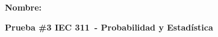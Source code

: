\documentclass[a4paper,addpoints,answers,11pt]{exam}
\newcommand{\course}{IEC 311}
\newcommand{\coursename}{Probabilidad y Estadística}
\begin{document}
\begin{flushleft}
\textbf{Nombre:}\ \hrulefill
\end{flushleft}
\begin{center}
\textbf{Prueba \#3 \course\ - \coursename}
\end{center}


\begin{center}
\addpoints
\gradetable[v]
\end{center}
\end{document}
